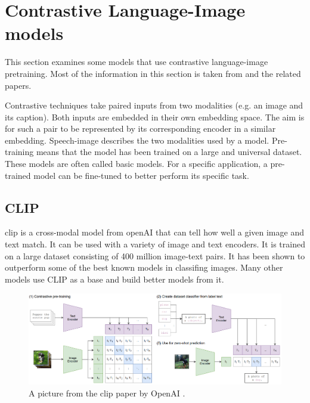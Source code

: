     
    \section{Contrastive Language-Image models
        \label{section:languageimagemodels}}
        This section examines some models that use contrastive language-image pretraining.
        Most of the information in this section is taken from \cite{cliplikeweb} and the related papers.

        Contrastive techniques take paired inputs from two modalities (e.g. an image and its caption).
        Both inputs are embedded in their own embedding space.
        The aim is for such a pair to be represented by its corresponding encoder in a similar embedding.
        Speech-image describes the two modalities used by a model.
        Pre-training means that the model has been trained on a large and universal dataset.
        These models are often called basic models.
        For a specific application, a pre-trained model can be fine-tuned to better perform its specific task.

        \subsection{CLIP
            \label{section:clip}}
        \acrfull{clip} \cite{clip} is a cross-modal model from openAI\cite{openai} that can tell how well a given image and text match.
        It can be used with a variety of image and text encoders.
        It is trained on a large dataset consisting of 400 million image-text pairs.
        It has been shown to outperform some of the best known models in classifing images.
        Many other models use CLIP as a base and build better models from it.

        \begin{figure}[!h]
            \centering
            \includegraphics[width=\textwidth]{Images/crossmodalnetworks/OpenAICLIP.png}
            \caption{A picture from the \acrshort{clip} paper by OpenAI \cite{clip}.}
            \label{fig:crossmodalnetworks:openaiclip}
        \end{figure}

